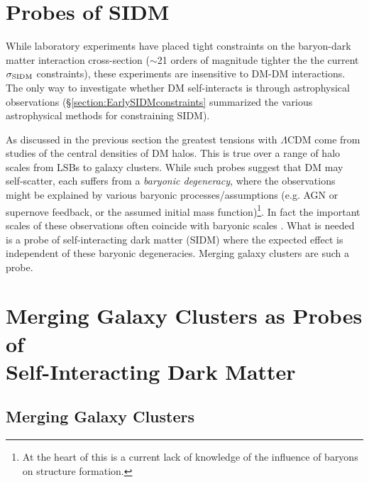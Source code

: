 \section{Probes of SIDM}\label{section:SIDMprobes}

While laboratory experiments have placed tight constraints on the baryon-dark matter interaction cross-section ($\sim$21 orders of magnitude tighter the the current $\sigma_{\rm SIDM}$ constraints), these experiments are insensitive to DM-DM interactions.
The only way to investigate whether DM self-interacts is through astrophysical observations (\S\ref{section:EarlySIDMconstraints} summarized the various astrophysical methods for constraining SIDM). 

As discussed in the previous section the greatest tensions with $\Lambda$CDM come from studies of the central densities of DM halos.
This is true over a range of halo scales from LSBs to galaxy clusters.
While such probes suggest that DM may self-scatter, each suffers from a \emph{baryonic degeneracy}, where the observations might be explained by various baryonic processes/assumptions (e.g. AGN or supernove feedback, or the assumed initial mass function)\footnote{At the heart of this is a current lack of knowledge of the influence of baryons on structure formation.}.
In fact the important scales of these observations often coincide with baryonic scales \citep[e.g. the core size in clusters is few factors smaller than the effective radius of the brightest cluster galaxy;][]{Newman:2012wt, Newman:2012tk}.
What is needed is a probe of self-interacting dark matter (SIDM) where the expected effect is independent of these baryonic degeneracies.
Merging galaxy clusters are such a probe. 

\section{Merging Galaxy Clusters as Probes of \\ Self-Interacting Dark Matter}\label{section:MergingClustersSIDMprobe}

\subsection{Merging Galaxy Clusters}\label{Section:MergingClusters}

